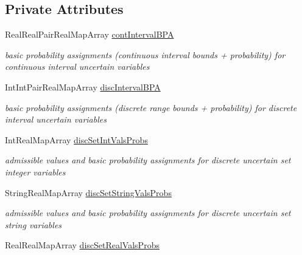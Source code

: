 \subsection*{Private Attributes}
\begin{DoxyCompactItemize}
\item 
Real\+Real\+Pair\+Real\+Map\+Array \hyperlink{classPecos_1_1EpistemicDistParamsRep_a9eaf4bb36ecab2682ba05d44b6619f14}{cont\+Interval\+B\+PA}\label{classPecos_1_1EpistemicDistParamsRep_a9eaf4bb36ecab2682ba05d44b6619f14}

\begin{DoxyCompactList}\small\item\em basic probability assignments (continuous interval bounds + probability) for continuous interval uncertain variables \end{DoxyCompactList}\item 
Int\+Int\+Pair\+Real\+Map\+Array \hyperlink{classPecos_1_1EpistemicDistParamsRep_a1f3f8a098c4bb51d2920395c0e29b7aa}{disc\+Interval\+B\+PA}\label{classPecos_1_1EpistemicDistParamsRep_a1f3f8a098c4bb51d2920395c0e29b7aa}

\begin{DoxyCompactList}\small\item\em basic probability assignments (discrete range bounds + probability) for discrete interval uncertain variables \end{DoxyCompactList}\item 
Int\+Real\+Map\+Array \hyperlink{classPecos_1_1EpistemicDistParamsRep_a60e7f972e185361ba1ca7bd9feff219f}{disc\+Set\+Int\+Vals\+Probs}\label{classPecos_1_1EpistemicDistParamsRep_a60e7f972e185361ba1ca7bd9feff219f}

\begin{DoxyCompactList}\small\item\em admissible values and basic probability assignments for discrete uncertain set integer variables \end{DoxyCompactList}\item 
String\+Real\+Map\+Array \hyperlink{classPecos_1_1EpistemicDistParamsRep_aa46741d9f0a8f10cc40138ebaefdb834}{disc\+Set\+String\+Vals\+Probs}\label{classPecos_1_1EpistemicDistParamsRep_aa46741d9f0a8f10cc40138ebaefdb834}

\begin{DoxyCompactList}\small\item\em admissible values and basic probability assignments for discrete uncertain set string variables \end{DoxyCompactList}\item 
Real\+Real\+Map\+Array \hyperlink{classPecos_1_1EpistemicDistParamsRep_aaf3880a0b86a8f541bb48793662785e8}{disc\+Set\+Real\+Vals\+Probs}\label{classPecos_1_1EpistemicDistParamsRep_aaf3880a0b86a8f541bb48793662785e8}


\end{DoxyCompactItemize}
